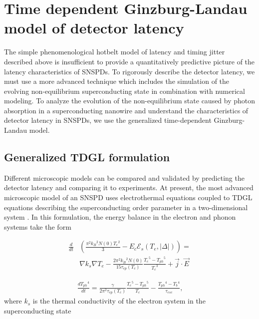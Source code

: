 \documentclass[%
reprint,
 amsmath,amssymb,
aps,
pra,
]{revtex4-1}
\begin{document}
\section{\label{sec:TDGLModel}Time dependent Ginzburg-Landau model of detector latency}

\quad The simple phenomenological hotbelt model of latency and timing jitter described above is insufficient to provide a quantitatively predictive picture of the latency characteristics of SNSPDs.  To rigorously describe the detector latency, we must use a more advanced technique which includes the simulation of the evolving non-equilibrium superconducting state in combination with numerical modeling.  To analyze the evolution of the non-equilibrium state caused by photon absorption in a superconducting nanowire and understand the characteristics of detector latency in SNSPDs, we use the generalized time-dependent Ginzburg-Landau model.  

\subsection{\label{sec:GenTDGL}Generalized TDGL formulation}
Different microscopic models can be compared and validated by predicting the detector latency and comparing it to experiments.  At present, the most advanced microscopic model of an SNSPD uses electrothermal equations coupled to TDGL equations describing the superconducting order parameter in a two-dimensional system \cite{vodolazov_single-photon_2017}.  In this formulation, the energy balance in the electron and phonon systems take the form

\begin{equation}\label{e balance}
\begin{aligned}
\frac{d}{dt}&\left(\frac{\pi^2 {k_B}^2 N(0) {T_e}^2}{3} - E_c \mathcal{E}_s \left(T_e,\left|\Delta\right|\right)  \right) = \\
&\nabla k_s \nabla T_e - \frac{2 {\pi}^2 {k_B}^2 N(0)}{15 \tau_{ep}\left(T_c\right)}\frac{{T_e}^5 - {T_{ph}}^5}{{T_c}^3} + \vec{j}\cdot\vec{E}
\end{aligned}     
\end{equation}

\begin{equation}\label{Ph balance}
\begin{aligned}
\frac{d {T_{ph}}^4}{dt} = \frac{\gamma}{2 {\pi}^2 \tau_{ep}\left(T_c\right)} \frac{{T_e}^5 - {T_{ph}}^5}{T_c} - \frac{{T_{ph}}^4 - {T_b}^4}{\tau_{esc}} \text{,}
\end{aligned}     
\end{equation}
where \(k_s\) is the thermal conductivity of the electron system in the superconducting state 
\end{document}
